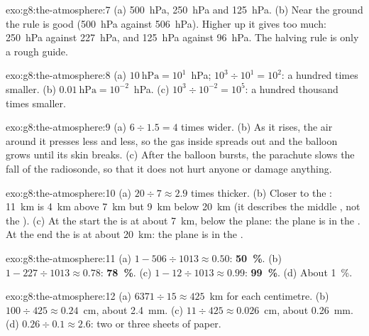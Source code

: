 \begin{solution}{exo:g8:the-atmosphere:7}
(a) \qty{500}{hPa}, \qty{250}{hPa} and \qty{125}{hPa}. (b) Near the
ground the rule is good (\qty{500}{hPa} against \qty{506}{hPa}). Higher
up it gives too much: \qty{250}{hPa} against \qty{227}{hPa}, and
\qty{125}{hPa} against \qty{96}{hPa}. The halving rule is only a rough
guide.
\end{solution}

\begin{solution}{exo:g8:the-atmosphere:8}
(a) $10~\text{hPa} = 10^1$~hPa; $10^3 \div 10^1 = 10^2$: a hundred times
smaller. (b) $0.01~\text{hPa} = 10^{-2}$~hPa. (c) $10^3 \div 10^{-2} =
10^5$: a hundred thousand times smaller.
\end{solution}

\begin{solution}{exo:g8:the-atmosphere:9}
(a) $6 \div 1.5 = 4$ times wider. (b) As it rises, the air around it
presses less and less, so the gas inside spreads out and the balloon
grows until its skin breaks. (c) After the balloon bursts, the parachute
slows the fall of the radiosonde, so that it does not hurt anyone or
damage anything.
\end{solution}

\begin{solution}{exo:g8:the-atmosphere:10}
(a) $20 \div 7 \approx 2.9$ times thicker. (b) Closer to the :
\qty{11}{km} is \qty{4}{km} above \qty{7}{km} but \qty{9}{km} below \qty{20}{km} (it describes the middle , not the ).
(c) At the start the  is at about \qty{7}{km}, below the
plane: the plane is in the . At the end the  is at
about \qty{20}{km}: the plane is in the .
\end{solution}

\begin{solution}{exo:g8:the-atmosphere:11}
(a) $1 - 506 \div 1013 \approx 0.50$: \textbf{50~\%}. (b) $1 - 227 \div
1013 \approx 0.78$: \textbf{78~\%}. (c) $1 - 12 \div 1013 \approx 0.99$:
\textbf{99~\%}. (d) About 1~\%.
\end{solution}

\begin{solution}{exo:g8:the-atmosphere:12}
(a) $6371 \div 15 \approx 425$~km for each centimetre. (b) $100 \div 425
\approx 0.24$~cm, about \qty{2.4}{mm}. (c) $11 \div 425 \approx
0.026$~cm, about \qty{0.26}{mm}. (d) $0.26 \div 0.1 \approx 2.6$: two or
three sheets of paper.
\end{solution}

